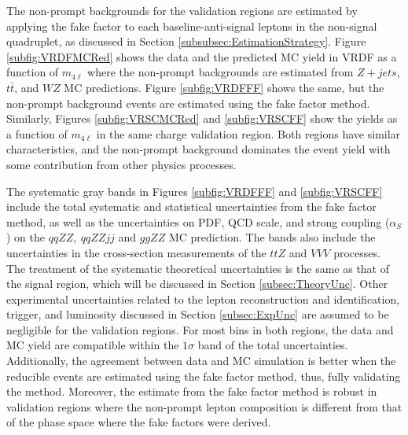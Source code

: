 The non-prompt backgrounds for the validation regions are estimated by applying the fake factor to each baseline-anti-signal leptons in the non-signal quadruplet, as discussed in Section \ref{subsubsec:EstimationStrategy}. Figure \ref{subfig:VRDFMCRed} shows the data and the predicted MC yield in VRDF as a function of $m_{4\ell}$ where the non-prompt backgrounds are estimated from $Z+jets$, $t\bar{t}$, and $WZ$ MC predictions. Figure \ref{subfig:VRDFFF} shows the same, but the non-prompt background events are estimated using the fake factor method. Similarly, Figures \ref{subfig:VRSCMCRed} and \ref{subfig:VRSCFF} show the yields as a function of $m_{4\ell}$ in the same charge validation region. Both regions have similar characteristics, and the non-prompt background dominates the event yield with some contribution from other physics processes.

The systematic gray bands in Figures \ref{subfig:VRDFFF} and \ref{subfig:VRSCFF} include the total systematic and statistical uncertainties from the fake factor method, as well as the uncertainties on PDF, QCD scale, and strong coupling ($\alpha_{S}$) on the $qqZZ,~qqZZjj$ and $ggZZ$ MC prediction. The bands also include the uncertainties in the cross-section measurements of the $ttZ$ and $VVV$ processes. The treatment of the systematic theoretical uncertainties is the same as that of the signal region, which will be discussed in Section \ref{subsec:TheoryUnc}. Other experimental uncertainties related to the lepton reconstruction and identification, trigger, and luminosity discussed in Section \ref{subsec:ExpUnc} are assumed to be negligible for the validation regions. For most bins in both regions, the data and MC yield are compatible within the $1\sigma$ band of the total uncertainties. Additionally, the agreement between data and MC simulation is better when the reducible events are estimated using the fake factor method, thus, fully validating the method. Moreover, the estimate from the fake factor method is robust in validation regions where the non-prompt lepton composition is different from that of the phase space where the fake factors were derived.


